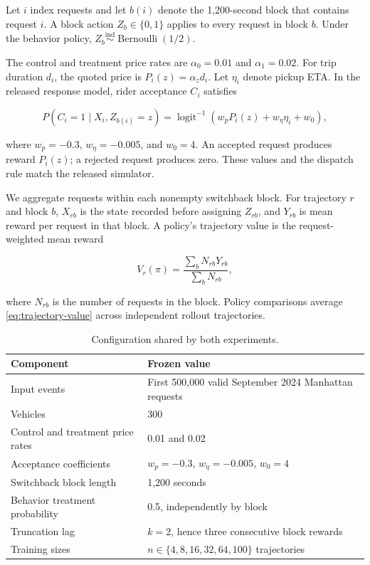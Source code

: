 \documentclass[opre,nonblindrev]{informs4}
\newenvironment{revision}{\begingroup\color{revisionblue}\ignorespaces}{\endgroup}
\begin{document}
\begin{revision}
Let \(i\) index requests and let \(b(i)\) denote the 1,200-second block that
contains request \(i\). A block action \(Z_b\in\{0,1\}\) applies to every
request in block \(b\). Under the behavior policy,
\(Z_b \stackrel{\mathrm{ind}}{\sim} \operatorname{Bernoulli}(1/2)\).

The control and treatment price rates are
\(\alpha_0=0.01\) and \(\alpha_1=0.02\). For trip duration \(d_i\), the quoted
price is \(P_i(z)=\alpha_zd_i\). Let \(\eta_i\) denote pickup ETA. In the
released response model, rider acceptance \(C_i\) satisfies

\begin{equation}
 P(C_i=1\mid X_i,Z_{b(i)}=z)
 =\operatorname{logit}^{-1}\!\left(
   w_p P_i(z)+w_\eta\eta_i+w_0
 \right),
 \label{eq:released-choice}
\end{equation}

where \(w_p=-0.3\), \(w_\eta=-0.005\), and \(w_0=4\). An accepted request
produces reward \(P_i(z)\); a rejected request produces zero. These values and
the dispatch rule match the released simulator.

We aggregate requests within each nonempty switchback block. For trajectory
\(r\) and block \(b\), \(X_{rb}\) is the state recorded before assigning
\(Z_{rb}\), and \(Y_{rb}\) is mean reward per request in that block. A policy's
trajectory value is the request-weighted mean reward

\begin{equation}
  V_r(\pi)=
  \frac{\sum_b N_{rb}Y_{rb}}{\sum_b N_{rb}},
  \label{eq:trajectory-value}
\end{equation}

where \(N_{rb}\) is the number of requests in the block. Policy comparisons
average \eqref{eq:trajectory-value} across independent rollout trajectories.

\begin{table}[ht]
\centering
\caption{Configuration shared by both experiments.}
\label{tab:common-config}
\small
\begin{tabular}{@{}ll@{}}
\toprule
Component & Frozen value \\
\midrule
Input events & First 500,000 valid September 2024 Manhattan requests \\
Vehicles & 300 \\
Control and treatment price rates & 0.01 and 0.02 \\
Acceptance coefficients & \(w_p=-0.3\), \(w_\eta=-0.005\), \(w_0=4\) \\
Switchback block length & 1,200 seconds \\
Behavior treatment probability & 0.5, independently by block \\
Truncation lag & \(k=2\), hence three consecutive block rewards \\
Training sizes & \(n\in\{4,8,16,32,64,100\}\) trajectories \\
\bottomrule
\end{tabular}
\end{table}
\end{revision}
\end{document}
